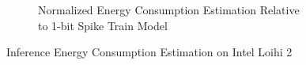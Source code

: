 \begin{figure}[H]
\begin{subfigure}[H]{0.495\textwidth}
                \caption{Normalized Energy Consumption Estimation Relative to 1-bit Spike Train Model}
            \end{subfigure}
            \caption{Inference Energy Consumption Estimation on Intel Loihi 2}
        \end{figure}
